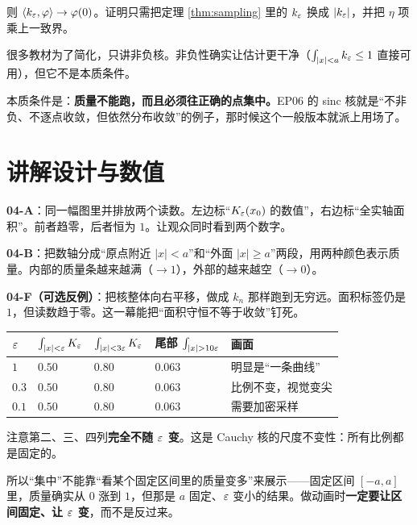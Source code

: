 则 $\langle k_\varepsilon,\varphi\rangle\to\varphi(0)$。证明只需把定理 \ref{thm:sampling} 里的 $k_\varepsilon$ 换成 $|k_\varepsilon|$，并把 $\eta$ 项乘上一致界。

\begin{warnbox}[非负性是可选项，“集中”不是]
很多教材为了简化，只讲非负核。非负性确实让估计更干净（$\int_{|x|<a}k_\varepsilon\le1$ 直接可用），但它不是本质条件。

本质条件是：\textbf{质量不能跑，而且必须往正确的点集中。}EP06 的 sinc 核就是“不非负、不逐点收敛，但依然分布收敛”的例子，那时候这个一般版本就派上用场了。
\end{warnbox}

\section{讲解设计与数值}

\begin{scriptbox}[动画要点 04-A / 04-B]
\textbf{04-A}：同一幅图里并排放两个读数。左边标“$K_\varepsilon(x_0)$ 的数值”，右边标“全实轴面积”。前者趋零，后者恒为 $1$。让观众同时看到两个数字。

\textbf{04-B}：把数轴分成“原点附近 $|x|<a$”和“外面 $|x|\ge a$”两段，用两种颜色表示质量。内部的质量条越来越满（$\to1$），外部的越来越空（$\to0$）。

\textbf{04-F（可选反例）}：把核整体向右平移，做成 $k_n$ 那样跑到无穷远。面积标签仍是 $1$，但读数趋于零。这一幕能把“面积守恒不等于收敛”钉死。
\end{scriptbox}

\begin{center}
\small
\renewcommand{\arraystretch}{1.35}
\begin{tabularx}{\textwidth}{@{}L{1.3cm}L{3.2cm}L{3.2cm}L{3.0cm}Y@{}}
\toprule
$\varepsilon$ & $\int_{|x|<\varepsilon}K_\varepsilon$ & $\int_{|x|<3\varepsilon}K_\varepsilon$ & 尾部 $\int_{|x|>10\ep}$ & 画面 \\
\midrule
$1$ & $0.50$ & $0.80$ & $0.063$ & 明显是“一条曲线” \\
$0.3$ & $0.50$ & $0.80$ & $0.063$ & 比例不变，视觉变尖 \\
$0.1$ & $0.50$ & $0.80$ & $0.063$ & 需要加密采样 \\
\bottomrule
\end{tabularx}
\end{center}

\begin{notebox}[这张表在说什么]
注意第二、三、四列\textbf{完全不随 $\varepsilon$ 变}。这是 Cauchy 核的尺度不变性：所有比例都是固定的。

所以“集中”不能靠“看某个固定区间里的质量变多”来展示——固定区间 $[-a,a]$ 里，质量确实从 $0$ 涨到 $1$，但那是 $a$ 固定、$\varepsilon$ 变小的结果。做动画时\textbf{一定要让区间固定、让 $\varepsilon$ 变}，而不是反过来。
\end{notebox}

